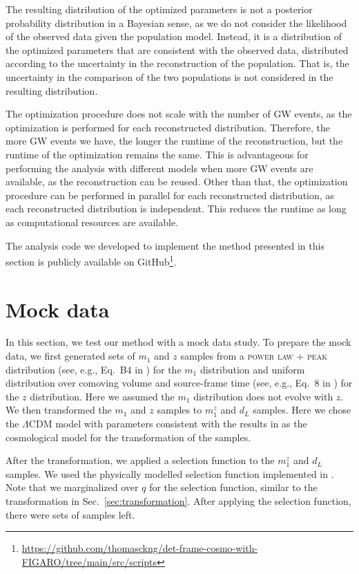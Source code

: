 \documentclass[sn-aps, pdflatex]{sn-jnl}
\begin{document}
The resulting distribution of the optimized parameters is not a posterior probability distribution in a Bayesian sense, as we do not consider the likelihood of the observed data given the population model.
Instead, it is a distribution of the optimized parameters that are consistent with the observed data, distributed according to the uncertainty in the reconstruction of the population.
That is, the uncertainty in the comparison of the two populations is not considered in the resulting distribution.

The optimization procedure does not scale with the number of \ac{GW} events, as the optimization is performed for each reconstructed distribution.
Therefore, the more \ac{GW} events we have, the longer the runtime of the reconstruction, but the runtime of the optimization remains the same.
This is advantageous for performing the analysis with different models when more \ac{GW} events are available, as the reconstruction can be reused.
Other than that, the optimization procedure can be performed in parallel for each reconstructed distribution, as each reconstructed distribution is independent.
This reduces the runtime as long as computational resources are available.

The analysis code we developed to implement the method presented in this section is publicly available on GitHub\footnote{ \url{https://github.com/thomasckng/det-frame-cosmo-with-FIGARO/tree/main/src/scripts}}.

\section{Mock data}
\label{sec:mock_data}

In this section, we test our method with a mock data study.
To prepare the mock data, we first generated  sets of $m_1$ and $z$ samples from a \textsc{power law + peak} distribution (see, e.g., Eq.~B4 in \cite{KAGRA:2021duu}) for the $m_1$ distribution and uniform distribution over comoving volume and source-frame time (see, e.g., Eq.~8 in \cite{KAGRA:2021duu}) for the $z$ distribution.
Here we assumed the $m_1$ distribution does not evolve with $z$.
We then transformed the $m_1$ and $z$ samples to $m^z_1$ and $d_L$ samples.
Here we chose the $\Lambda$CDM model with parameters consistent with the results in \cite{Planck:2018vyg} as the cosmological model for the transformation of the samples.

After the transformation, we applied a selection function to the $m^z_1$ and $d_L$ samples.
We used the physically modelled selection function implemented in \cite{Lorenzo-Medina:2024opt}.
Note that we marginalized over $q$ for the selection function, similar to the transformation in Sec.~\ref{sec:transformation}.
After applying the selection function, there were  sets of samples left.
\end{document}
